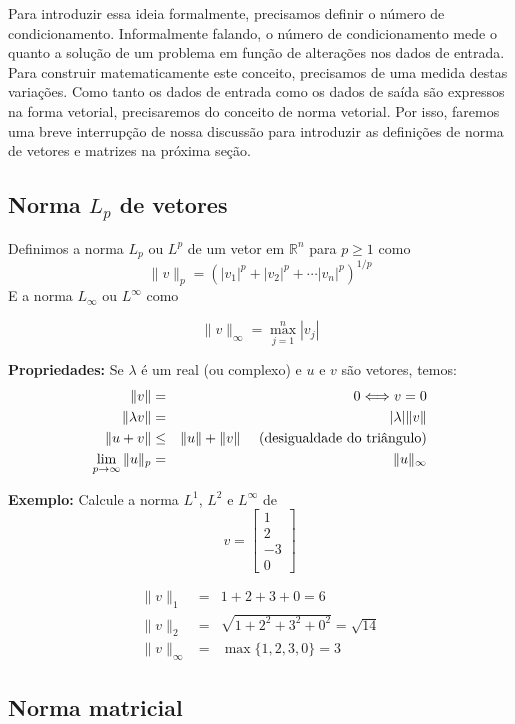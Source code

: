 Para introduzir essa ideia formalmente, precisamos definir o número de condicionamento. Informalmente falando, o número de condicionamento mede o quanto a solução de um problema em função de alterações nos dados de entrada. Para construir matematicamente este conceito, precisamos de uma medida destas variações. Como tanto os dados de entrada como os dados de saída são expressos na forma vetorial, precisaremos do conceito de norma vetorial. Por isso, faremos uma breve interrupção de nossa discussão para introduzir as definições de norma de vetores e matrizes na próxima seção.

\subsection{Norma $L_p$ de vetores}

Definimos a norma $L_p$ ou $L^p$ de um vetor em $\mathbb{R}^n$ para $p\geq 1$ como
$$\|v\|_p=\left(|v_1|^p+|v_2|^p+\cdots |v_n|^p\right)^{1/p}$$
E a norma $L_\infty$ ou $L^{\infty}$ como

$$\|v\|_\infty=\max_{j=1}^n|v_j|$$

{\bf Propriedades:} Se $\lambda$ é um real (ou complexo) e $u$ e  $v$ são vetores, temos:
\begin{eqnarray*}
\|v\|&=&0 \Longleftrightarrow v=0\\
\|\lambda v\|&=&|\lambda| \|v\|\\
\|u+v\| &\leq & \|u\| + \|v\|~~~~ (\hbox{desigualdade do triângulo})\\
\lim_{p\to\infty}\|u\|_p &=& \|u\|_{\infty}
\end{eqnarray*}


{\bf Exemplo: } Calcule a norma $L^1$, $L^2$ e $L^\infty$ de
$$v=\left[\begin{array}{c}1\\2\\-3\\0
\end{array}\right]$$

\begin{eqnarray*}
\|v\|_1&=&1+2+3+0=6\\
\|v\|_2&=&\sqrt{1+2^2+3^2+0^2}=\sqrt{14}\\
\|v\|_\infty&=&\max\{1,2,3,0\}=3
\end{eqnarray*}


\subsection{Norma matricial}

